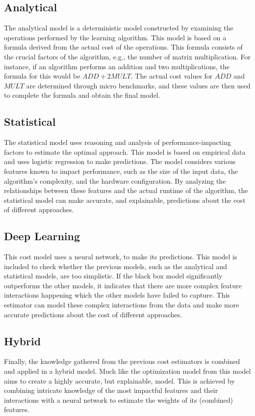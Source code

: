 \subsection{Analytical}
The analytical model is a deterministic model constructed by examining the operations performed by the learning algorithm. This model is based on a formula derived from the actual cost of the operations. This formula consists of the crucial factors of the algorithm, e.g., the number of matrix multiplication. For instance, if an algorithm performs an addition and two multiplications, the formula for this would be $ADD + 2MULT$. The actual cost values for $ADD$ and $MULT$ are determined through micro benchmarks, and these values are then used to complete the formula and obtain the final model.

\subsection{Statistical}
The statistical model uses reasoning and analysis of performance-impacting factors to estimate the optimal approach. This model is based on empirical data and uses logistic regression to make predictions. The model considers various features known to impact performance, such as the size of the input data, the algorithm's complexity, and the hardware configuration. By analyzing the relationships between these features and the actual runtime of the algorithm, the statistical model can make accurate, and explainable, predictions about the cost of different approaches.

\subsection{Deep Learning}
This cost model uses a neural network, to make its predictions. This model is included to check whether the previous models, such as the analytical and statistical models, are too simplistic. If the black box model significantly outperforms the other models, it indicates that there are more complex feature interactions happening which the other models have failed to capture. This estimator can model these complex interactions from the data and make more accurate predictions about the cost of different approaches.

\subsection{Hybrid}
Finally, the knowledge gathered from the previous cost estimators is combined and applied in a hybrid model. Much like the optimization model from \cite{halide_cost_model} this model aims to create a highly accurate, but explainable, model. This is achieved by combining intricate knowledge of the most impactful features and their interactions with a neural network to estimate the weights of its (combined) features.

